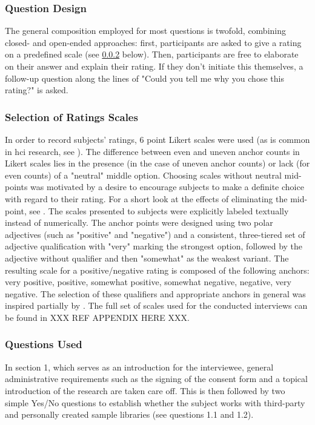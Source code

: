 \subsubsection{Question Design}
\label{subsubsec:question_design}
The general composition employed for most questions is twofold, combining
closed- and open-ended approaches: first,
participants are asked to give a rating on a predefined scale (see
\ref{subsubsec:ratings_scales} below).
Then, participants are free to elaborate on their answer and explain their
rating. If they don't initiate this themselves, a follow-up question along the
lines of "Could you tell me why you chose this rating?" is asked.

\subsubsection{Selection of Ratings Scales}
\label{subsubsec:ratings_scales}
In order to record subjects' ratings, 6 point Likert scales were used (as is
common in \gls{hci} research, see \citet[p.31, p.93]{lazar2017}). The difference
between even and uneven anchor counts in Likert scales lies in the presence (in
the case of uneven anchor counts) or lack (for even counts) of a "neutral"
middle option. Choosing scales without neutral mid-points was motivated by a
desire to encourage subjects to make a definite choice with regard to their
rating. For a short look at the effects of eliminating the mid-point, see
\citet{garland1991}.
\smallskip
The scales presented to subjects were explicitly labeled textually instead of
numerically. The anchor points were designed using two polar adjectives (such as
"positive" and "negative") and a consistent, three-tiered set of adjective
qualification with "very" marking the strongest option, followed by the
adjective without qualifier and then "somewhat" as the weakest variant. The
resulting scale for a positive/negative rating is composed of the following
anchors: very positive, positive, somewhat positive, somewhat negative,
negative, very negative. The selection of these qualifiers and appropriate
anchors in general was inspired partially by \citet{vagias2006}. The full set of
scales used for the conducted interviews can be found in
XXX REF APPENDIX HERE XXX.

\subsubsection{Questions Used}
\label{subsubsec:questions_used}
In section 1, which serves as an introduction for the interviewee, general
administrative requirements such as the signing of the consent form and a
topical introduction of the research are taken care off. This is then followed
by two simple Yes/No questions to establish whether the subject works with
third-party and personally created sample libraries (see questions 1.1 and
1.2).

